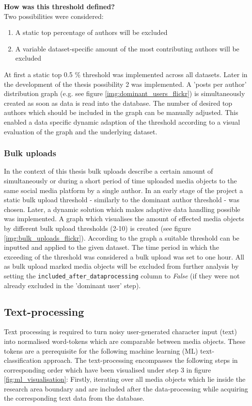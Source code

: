 \textbf{How was this threshold defined?}\\

Two possibilities were considered:
\begin{enumerate}
  \item A static top percentage of authors will be excluded
  \item A variable dataset-specific amount of the most contributing authors will be excluded
\end{enumerate}

At first a static top 0.5 \% threshold was implemented across all datasets. Later in the development of the thesis possibility 2 was implemented. A 'posts per author' distribution graph (e.g. see figure \ref{img:dominant_users_flickr}) is simultaneously created as soon as data is read into the database. The number of desired top authors which should be included in the graph can be manually adjusted. This enabled a data specific dynamic adaption of the threshold according to a visual evaluation of the graph and the underlying dataset. 

\subsubsection{Bulk uploads} \label{bias_bulk_uploads}
In the context of this thesis bulk uploads describe a certain amount of simultaneously or during a short period of time uploaded media objects to the same social media platform by a single author. In an early stage of the project a static bulk upload threshold - similarly to the dominant author threshold - was chosen. Later, a dynamic solution which makes adaptive data handling possible was implemented. A graph which visualises the amount of effected media objects by different bulk upload thresholds (2-10) is created (see figure \ref{img:bulk_uploads_flickr}). According to the graph a suitable threshold can be inputted and applied to the given dataset. The time period in which the exceeding of the threshold was considered a bulk upload was set to one hour. 
All as bulk upload marked media objects will be excluded from further analysis by setting the \texttt{included\_after\_dataprocessing} column to \textit{False} (if they were not already excluded in the 'dominant user' step).

\subsection{Text-processing} \label{text_processing}
Text processing is required to turn noisy user-generated character input (text) into normalised word-tokens which are comparable between media objects. These tokens are a prerequisite for the following machine learning (ML) text-classification approach. The text-processing encompasses the following steps in corresponding order which have been visualised under step 3 in figure \ref{fig:ml_visualisation}: Firstly, iterating over all media objects which lie inside the research area boundary and are included after the data-processing while acquiring the corresponding text data from the database.

